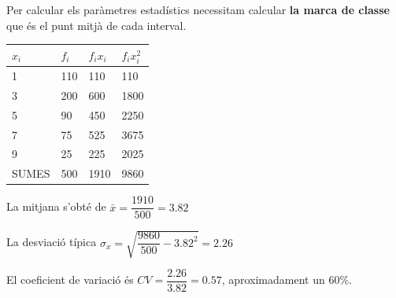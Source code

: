 \begin{resolt}[E]
	Per calcular els paràmetres estadístics necessitam calcular \textbf{la marca de classe} que és el punt mitjà de cada interval.
	\begin{center}
		\begin{tabular}{|p{0.7in}|p{0.8in}|p{0.8in}|p{0.8in}|} \hline 
		$x_i$ & $f_i$ & $f_i x_i$ & $f_i x_i^2$\\ \hline 
		1 & 110 & 110 & 110 \\ \hline 
		3 & 200 & 600 & 1800 \\ \hline 
		5 & 90 & 450 & 2250\\ \hline 
		7 & 75 & 525 & 3675 \\ \hline 
		9 & 25 & 225 & 2025 \\ \hline\hline
		\rowcolor{lightgray} SUMES & 500 & 1910 & 9860\\ \hline 
	\end{tabular}
	\end{center}	\vspace{0.24cm}

	 La mitjana s'obté de $\bar x = \dfrac{1910}{500}=3.82$
	 
	 La desviació típica  $\sigma_x = \sqrt{ \dfrac{9860}{500}-3.82^2 }=2.26$
	 
	 El coeficient de variació és $CV = \dfrac{2.26}{3.82}=0.57$, aproximadament un 60\%.
	 
	\end{resolt}
	\vspace{1cm}

